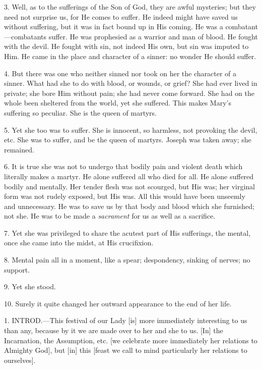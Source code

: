 3. Well, as to the sufferings of the Son of God,
they are awful mysteries; but they need not surprise us, for He comes
to suffer. He indeed might have saved us without suffering, but it was
in fact bound up in His coming. He was a combatant—combatants
suffer. He was prophesied as a warrior and man of blood. He fought
with the devil. He fought with sin, not indeed His own, but sin was
imputed to Him. He came in the place and character of a sinner: no
wonder He should suffer.

4. But there was one who neither sinned nor took
on her the character of a sinner. What had she to do with blood, or
wounds, or grief? She had ever lived in private; she bore Him without
pain; she had never come forward. She had on the whole been sheltered
from the world, yet she suffered. This makes Mary's suffering so
peculiar. She is the queen of martyrs.

5. Yet she too was to suffer. She is innocent, so
harmless, not provoking the devil, etc. She was to suffer, and be the
queen of martyrs. Joseph was taken away; she remained.

6. It is true she was not to undergo that bodily
pain and violent death which literally makes a martyr. He alone
suffered all who died for all. He alone suffered bodily and mentally.
Her tender flesh was not scourged, but His was; her virginal form was
not rudely exposed, but His was. All this would have been
unseemly and unnecessary. He was to save us by that body and blood
which she furnished; not she. He was to be made a \emph{sacrament} for
us as well as a sacrifice.

7. Yet she was privileged to share the acutest
part of His sufferings, the mental, once she came into the midst, at
His crucifixion.

8. Mental pain all in a moment, like a spear;
despondency, sinking of nerves; no support.

9. Yet she stood.

10. Surely it quite changed her outward
appearance to the end of her life.


1. INTROD.—This
festival of our Lady [is] more immediately interesting to us than any,
because by it we are made over to her and she to us. [In] the
Incarnation, the Assumption, etc. [we celebrate more immediately her
relations to Almighty God], but [in] this [feast we call to mind
particularly her relations to ourselves].

